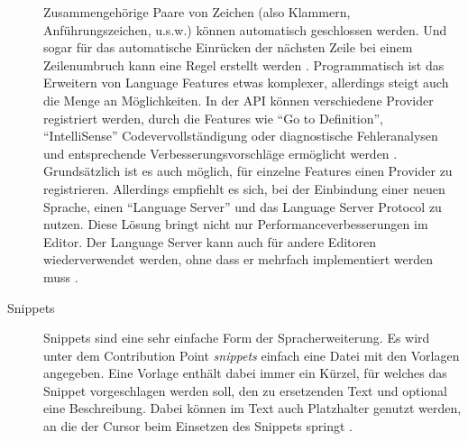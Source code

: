 \begin{description}
      Zusammengehörige Paare von Zeichen (also Klammern, Anführungszeichen, u.s.w.) können automatisch geschlossen werden.
      Und sogar für das automatische Einrücken der nächsten Zeile bei einem Zeilenumbruch kann eine Regel erstellt werden
      \cite{VSCodeExtensionAPILanguageConfigurationGuide}.
      Programmatisch ist das Erweitern von Language Features etwas komplexer, allerdings steigt auch die
      Menge an Möglichkeiten. In der API können verschiedene Provider registriert werden, durch die Features wie
      \enquote{Go to Definition}, \enquote{IntelliSense} Codevervollständigung oder diagnostische Fehleranalysen und
      entsprechende Verbesserungsvorschläge ermöglicht werden
      \cite{VSCodeExtensionAPIProgrammaticLanguageFeatures}. 
      Grundsätzlich ist es auch möglich, für einzelne
      Features einen Provider zu registrieren. Allerdings empfiehlt es sich, bei der Einbindung einer neuen
      Sprache, einen \enquote{Language Server} und das Language Server Protocol zu nutzen. Diese Lösung
      bringt nicht nur Performanceverbesserungen im Editor. Der Language Server kann auch für 
      andere Editoren wiederverwendet werden, ohne dass er mehrfach implementiert werden muss \cite{GunasingheNadeeshaan2022Lspa,LSPHomepage}.
    \item[Snippets] 
      Snippets sind eine sehr einfache Form der Spracherweiterung. Es wird unter dem Contribution Point
      \emph{snippets} einfach eine Datei mit den Vorlagen angegeben. Eine Vorlage enthält dabei immer
      ein Kürzel, für welches das Snippet vorgeschlagen werden soll, den zu ersetzenden Text und optional
      eine Beschreibung. Dabei können im Text auch Platzhalter genutzt werden, an die der Cursor beim Einsetzen
      des Snippets springt
      \cite{VSCodeExtensionAPISnippetGuide}.
  \end{description}
